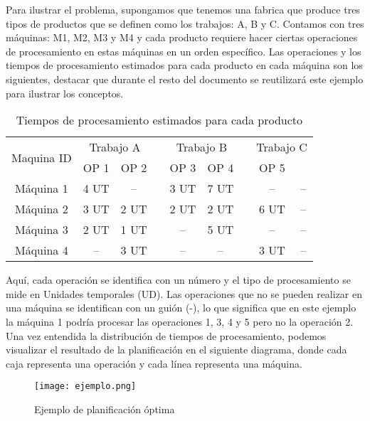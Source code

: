 Para ilustrar el problema, supongamos que tenemos una fabrica que produce tres tipos de productos
que se definen como los trabajos: A, B y C. Contamos con tres máquinas: M1, M2, M3 y M4 
y cada producto requiere hacer ciertas operaciones de procesamiento en estas máquinas en 
un orden específico. Las operaciones y los tiempos de procesamiento estimados para cada 
producto en cada máquina son los siguientes, destacar que durante el resto del documento
se reutilizará este ejemplo para ilustrar los conceptos. 

\begin{table}[ht]
    \caption{Tiempos de procesamiento estimados para cada producto} 
    \centering 
    \begin{tabular}{ccccccccc}  

    \toprule
    \multirow{2}{*}{\parbox[c]{.2\linewidth}{\centering Maquina ID}} & 
    \multicolumn{2}{c}{Trabajo A} && 
    \multicolumn{2}{c}{Trabajo B} && 
    \multicolumn{2}{c}{Trabajo C} \\ 

    \cmidrule{2-3} \cmidrule{5-6} \cmidrule{8-9}
     & {\centering OP 1} & {OP 2} && {OP 3} & {OP 4} && {OP 5}\\

    \midrule
    Máquina 1 & 4 UT & --   && 3 UT & 7 UT && --   & -- \\
    Máquina 2 & 3 UT & 2 UT && 2 UT & 2 UT && 6 UT & -- \\
    Máquina 3 & 2 UT & 1 UT && --   & 5 UT && --   & -- \\  
    Máquina 4 & --   & 3 UT && --   & --   && 3 UT & -- \\ 
    \bottomrule
    
    \end{tabular}
\end{table}

Aquí, cada operación se identifica con un número y el tipo de procesamiento se mide en Unidades temporales
(UD). Las operaciones que no se pueden realizar en una máquina se identifican con un guión (-), lo que 
significa que en este ejemplo la máquina 1 podría procesar las operaciones 1, 3, 4 y 5 pero 
no la operación 2. Una vez entendida la distribución de tiempos de procesamiento, podemos visualizar
el resultado de la planificación en el siguiente diagrama, donde cada caja representa una operación 
y cada línea representa una máquina.

\begin{figure}[ht]
    \centering
    \texttt{[image: ejemplo.png]}
    \caption{Ejemplo de planificación óptima}
    \label{fig:example-solution}
\end{figure}

